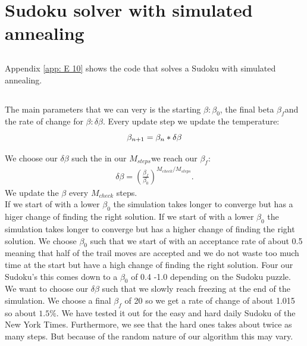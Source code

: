 \section{Sudoku solver with simulated annealing}
\subsection{}
Appendix \ref{app: E 10} shows the code that solves a Sudoku with simulated annealing.
\subsection{}
The main parameters that we can very is the starting $\beta: \beta_0$, the final beta $\beta_f$and the rate of change for $\beta: \delta \beta$. Every update step we update the temperature:
\begin{equation*}
    \centering
    \beta_{n +1} = \beta_n * \delta \beta
\end{equation*}

We choose our $\delta \beta$ such the in our $M_{steps}$we reach our $\beta_f$:
\begin{align*}
    \delta \beta = \left ( \frac{\beta_f}{\beta_0} \right )^{M_{check}/M_{steps}}.
\end{align*}
We update the $\beta$ every $M_{check}$ steps.\\
If we start of with a lower $\beta_0$ the simulation takes longer to converge but has a higer change of finding the right solution.
If we start of with a lower $\beta_0$ the simulation takes longer to converge but has a higher change of finding the right solution.
We choose $\beta_0$ such that we start of with an acceptance rate of about 0.5 meaning that half of the trail moves are accepted and we do not waste too much time at the start but have a high change of finding the right solution.
Four our Sudoku's this comes down to a $\beta_0$ of 0.4 -1.0 depending on the Sudoku puzzle.
We want to choose our $\delta \beta$ such that we slowly reach freezing at the end of the simulation. 
We choose a final $\beta_f$ of 20 so we get a rate of change of about 1.015 so about $1.5 \% $.
We have tested it out for the easy and hard daily Sudoku of the New York Times. Furthermore, we see that the hard ones takes about twice as many steps.
But because of the random nature of our algorithm this may vary.
\subsection{}

